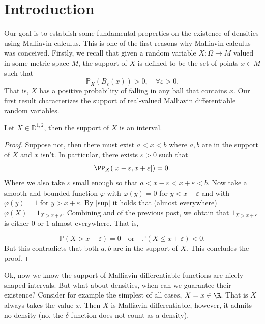 \documentclass[
    a4paper,
    DIV=14,
    abstract=true,
    numbers=noenddot
]{scrartcl}
\begin{document}
	\section{Introduction}
	Our goal is to establish some fundamental properties on the existence of densities using Malliavin calculus. This is one of the first reasons why Malliavin calculus was conceived. Firstly, we recall that given a random variable $X:\Omega\to M$ valued in some metric space $M$, the support of  $X$ is defined to be the set of points $x\in M$ such that
	\begin{equation*}
		\mathbb{P}_X(B_\varepsilon(x))>0,\quad\forall \varepsilon>0.
	\end{equation*}
	That is, $X$ has a positive probability of falling in any ball that contains  $x$. Our first result characterizes the support of real-valued Malliavin differentiable random variables.
	\begin{proposition}
		Let $X\in \mathbb{D}^{1,2}$, then the support of $X$ is an interval.
	\end{proposition}
	\begin{proof}
		Suppose not, then there must exist $a<x<b$ where  $a,b$ are in the support of  $X$ and  $x$ isn't. In particular, there exists  $\varepsilon >0$ such that
		\begin{equation}\label{sup}
			\PP_X([x-\varepsilon ,x+\varepsilon ])=0.
		\end{equation}
		Where we also take $\varepsilon$ small enough so that $a<x-\varepsilon<x+\varepsilon<b$.
		Now take a smooth and bounded function $\varphi$ with $\varphi(y)=0$ for $y<x-\varepsilon $ and with $\varphi(y)=1$ for $y>x+\varepsilon$. By \eqref{sup} it holds that (almost everywhere) $\varphi(X)=1_{X>x+\varepsilon}$. Combining  and  of the previous post, we obtain that $1_{X>x+\varepsilon}$ is either $0$ or $1$ almost everywhere. That is,

		\begin{equation*}
			\mathbb{P}(X>x+\varepsilon)=0\quad \text{or}\quad \mathbb{P}(X\leq x+\varepsilon)<0 .
		\end{equation*}
		But this contradicts that both $a,b$ are in the support of $X$. This concludes the proof.
	\end{proof}
	Ok, now we know the support of Malliavin differentiable functions are nicely shaped intervals. But what about densities, when can we guarantee their existence? Consider for example the simplest of all cases, $X=x\in \R$. That is $X$ always takes the value  $x$. Then  $X$ is Malliavin differentiable, however, it admits no density (no, the $\delta $ function does not count as a density).
\end{document}
